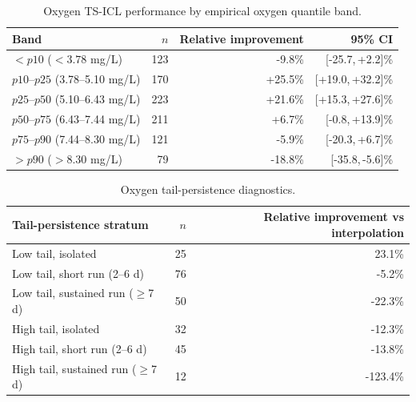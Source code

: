 \begin{table}[h]
  \centering
  \small
  \caption{Oxygen TS-ICL performance by empirical oxygen quantile band.}
  \label{tab:appendix_oxygen_quantile_bands}
  \begin{tabular}{l r r r}
    \toprule
    Band & $n$ & Relative improvement & 95\% CI \\
    \midrule
    $<p10$ ($<3.78$ mg/L) & 123 & -9.8\% & [-25.7,\,+2.2]\% \\
    $p10$--$p25$ (3.78--5.10 mg/L) & 170 & +25.5\% & [+19.0,\,+32.2]\% \\
    $p25$--$p50$ (5.10--6.43 mg/L) & 223 & +21.6\% & [+15.3,\,+27.6]\% \\
    $p50$--$p75$ (6.43--7.44 mg/L) & 211 & +6.7\% & [-0.8,\,+13.9]\% \\
    $p75$--$p90$ (7.44--8.30 mg/L) & 121 & -5.9\% & [-20.3,\,+6.7]\% \\
    $>p90$ ($>8.30$ mg/L) & 79 & -18.8\% & [-35.8,\,-5.6]\% \\
    \bottomrule
  \end{tabular}
\end{table}

\begin{table}[H]
  \centering
  \small
  \caption{Oxygen tail-persistence diagnostics.}
  \label{tab:appendix_oxygen_tail_persistence}
  \begin{tabular}{l r r}
    \toprule
    Tail-persistence stratum & $n$ & Relative improvement vs interpolation \\
    \midrule
    Low tail, isolated & 25 & 23.1\% \\
    Low tail, short run (2--6 d) & 76 & -5.2\% \\
    Low tail, sustained run ($\geq$7 d) & 50 & -22.3\% \\
    High tail, isolated & 32 & -12.3\% \\
    High tail, short run (2--6 d) & 45 & -13.8\% \\
    High tail, sustained run ($\geq$7 d) & 12 & -123.4\% \\
    \bottomrule
  \end{tabular}
\end{table}